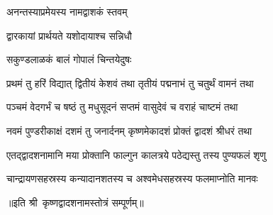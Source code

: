 
{अनन्तस्याप्रमेयस्य नामद्वाशकं स्तवम्}

{द्वारकायां प्रार्थयते यशोदायाश्च सन्निधौ}

{सकुण्डलाळकं बालं गोपालं चिन्तयेदुषः}

\twolineshloka
{प्रथमं तु हरिं विद्यात् द्वितीयं केशवं तथा}
{तृतीयं पद्मनाभं तु चतुर्थं वामनं तथा}%

\twolineshloka
{पञ्चमं वेदगर्भं च षष्ठं तु मधुसूदनं}
{सप्तमं वासुदेवं च वराहं चाष्टमं तथा}%

\twolineshloka
{नवमं पुण्डरीकाक्षं दशमं तु जनार्दनम्}
{कृष्णमेकादशं प्रोक्तं द्वादशं श्रीधरं तथा}%

\twolineshloka
{एतद्द्वादशनामानि मया प्रोक्तानि फाल्गुन}
{कालत्रये पठेद्यस्तु तस्य पुण्यफलं शृणु}%

\twolineshloka
{चान्द्रायणसहस्रस्य कन्यादानशतस्य च}
{अश्वमेधसहस्रस्य फलमाप्नोति मानवः}%

॥इति श्री~कृष्णद्वादशनामस्तोत्रं सम्पूर्णम्‌॥